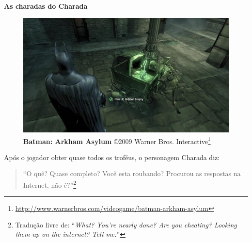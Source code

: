\expandafter\documentclass\expandafter[table, usenames, svgnames, dvipsnames, \classopts]{beamer}
\begin{document}
\begin{frame}{\textbf{As charadas do Charada}}

	\begin{figure}
		\centering
		\includegraphics[height=0.3\paperheight]{batman-riddler}
		\caption{\tiny \textbf{Batman: Arkham Asylum} \copyright{2009} Warner Bros. Interactive\footnote{\url{http://www.warnerbros.com/videogame/batman-arkham-asylum}}}
	\end{figure}

	Após o jogador obter quase todos os troféus, o personagem Charada diz:

	\vspace{1em}

	\begin{verse}
		\noindent
		\Large
		``O quê? Quase completo? Você esta roubando? Procurou as respostas na Internet, não é?''\footnote{Tradução livre de: ``\textit{What? You're nearly done? Are you cheating? Looking them up on the internet? Tell me.}''}
	\end{verse}
	
	\vspace{1em}
	
\end{frame}
\end{document}
